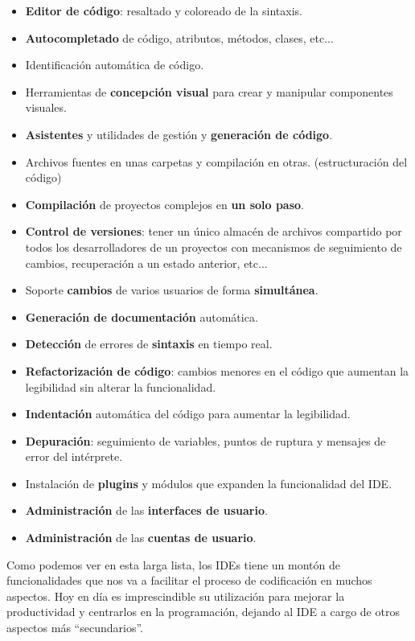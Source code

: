 \begin{itemize}
    \item \textbf{Editor de código}: resaltado y coloreado de la sintaxis.
    \item \textbf{Autocompletado} de código, atributos, métodos, clases, etc...
    \item Identificación automática de código.
    \item Herramientas de \textbf{concepción visual} para crear y manipular componentes visuales.
    \item \textbf{Asistentes} y utilidades de gestión y \textbf{generación de código}.
    \item Archivos fuentes en unas carpetas y compilación en otras. (estructuración del código)
    \item \textbf{Compilación} de proyectos complejos en \textbf{un solo paso}.
    \item \textbf{Control de versiones}: tener un único almacén de archivos compartido por todos los desarrolladores de un proyectos con mecanismos de seguimiento de cambios, recuperación a un estado anterior, etc...
    \item Soporte \textbf{cambios} de varios usuarios de forma \textbf{simultánea}.
    \item \textbf{Generación de documentación} automática.
    \item \textbf{Detección} de errores de \textbf{sintaxis} en tiempo real.
    \item \textbf{Refactorización de código}: cambios menores en el código que aumentan la legibilidad sin alterar la funcionalidad.
    \item \textbf{Indentación} automática del código para aumentar la legibilidad.
    \item \textbf{Depuración}: seguimiento de variables, puntos de ruptura y mensajes de error del intérprete.
    \item Instalación de \textbf{plugins} y módulos que expanden la funcionalidad del IDE.
    \item \textbf{Administración} de las \textbf{interfaces de usuario}.
    \item \textbf{Administración} de las \textbf{cuentas de usuario}.
\end{itemize}

Como podemos ver en esta larga lista, los IDEs tiene un montón de funcionalidades que nos va a facilitar el proceso de codificación en muchos aspectos. Hoy en día es imprescindible su utilización para mejorar la productividad y centrarlos en la programación, dejando al IDE a cargo de otros aspectos más ``secundarios''.

